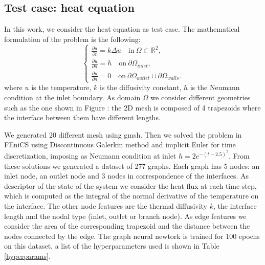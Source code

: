 \documentclass[11pt,a4paper]{article}
\begin{document}

\subsection{Test case: heat equation}

In this work, we consider the heat equation as test case. 
The mathematical formulation of the problem is the following:
\begin{equation}
    \begin{cases}
        \frac{\partial u }{\partial t} = k \Delta u \quad \text{in} \ \Omega \subset \mathbb{R}^2, \\
        \frac{\partial u}{\partial n} = h \quad \text{on} \ \partial \Omega_{inlet}, \\
        \frac{\partial u}{\partial n} = 0 \quad \text{on} \ \partial \Omega_{outlet} 
        \cup \partial \Omega_{walls}.
    \end{cases}
\end{equation}
where \(u\) is the temperature, \(k\) is the diffusivity constant, \(h\) is the Neumann condition at the inlet boundary. As domain \(\Omega\) we consider different geometries such as the one shown in Figure : the 2D mesh is composed of 4 trapezoids where the interface between them have different lengths.

We generated 20 different mesh using gmsh. 
Then we solved the problem in FEniCS using Discontinuous Galerkin method and implicit Euler for time discretization, imposing as Neumann condition at inlet \(h = 2e^{-(t-2.5)^2}\).
From these solutions we generated a dataset of 277 graphs. 
Each graph has 5 nodes: an inlet node, an outlet node and 3 nodes in correspondence of the interfaces. 
As descriptor of the state of the system we consider the heat flux at each time step, which is computed as the integral of the normal derivative of the temperature on the interface. The other node features are the thermal diffusivity \(k\), the interface length and the nodal type (inlet, outlet or branch node). 
As edge features we consider the area of the corresponding trapezoid and the distance between the nodes connected by the edge. 
The graph neural newtork is trained for 100 epochs on this dataset, a list of the hyperparameters used is shown in Table \ref{hyperparams}.
\end{document}
